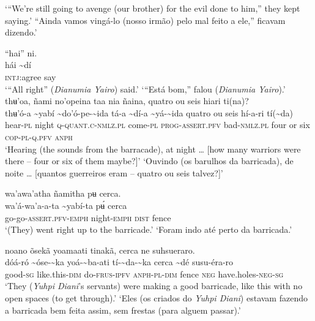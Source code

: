 \documentclass[output=paper,
modfonts,nonflat
]{langsci/langscibook}
\begin{document}
\glt ‘“We're still going to avenge (our brother) for the evil done to him,” they kept saying.’
\glt “Ainda vamos vingá-lo (nosso irmão) pelo mal feito a ele,” ficavam dizendo.’
\z

\ea “hai” ni. \\[.3em]
\gll hái	{\textasciitilde}dí \\
     \textsc{intj:}agree	say\\
\glt ‘“All right” (\textit{Dianumia Yairo}) said.’
\glt ‘“Está bom,” falou (\textit{Dianumia Yairo}).’
\z 
\ea thʉ'oa, ñami no'opeina taa nia ñaina, quatro ou seis hiari ti(na)?  \\[.3em]
\gll thʉ'ó-a	{\textasciitilde}yabí	{\textasciitilde}do'ó-pe-{\textasciitilde}ida	tá-a	{\textasciitilde}dí-a	{\textasciitilde}yá-{\textasciitilde}ida quatro ou seis	hí-a-ri	tí({\textasciitilde}da)\\
     hear\textsc{-pl}	night	\textsc{q-quant.c-nmlz.pl}	come\textsc{-pl}	\textsc{prog-assert.pfv}	bad\textsc{-nmlz.pl} four or six	\textsc{cop-pl-q.pfv}	\textsc{anph}\\
\glt ‘Hearing (the sounds from the barracade), at night … [how many warriors were there – four or six of them maybe?]’ 
\glt ‘Ouvindo (os barulhos da barricada), de noite … [quantos guerreiros eram – quatro ou seis talvez?]’ 
\z 

\ea wa'awa'atha ñamitha pʉ cerca. \\[.3em]
\gll wa'á-wa'a-a-ta	{\textasciitilde}yabí-ta	pʉ́	cerca \\
     go-go-\textsc{assert.pfv-emph}	night-\textsc{emph}	\textsc{dist} fence\\
\glt ‘(They) went right up to the barricade.’
\glt ‘Foram indo até perto da barricada.’
\z 

\ea noano õsekã yoamaati tinakã, cerca ne suhsueraro. \\[.3em]
\gll {\textasciitilde}dóá-ró	{\textasciitilde}óse-{\textasciitilde}ka	yoá-{\textasciitilde}ba-ati	tí-{\textasciitilde}da-{\textasciitilde}ka	cerca	{\textasciitilde}dé	susu-éra-ro \\
     good\textsc{-sg}	like.this-\textsc{dim}	do-\textsc{frus-ipfv}	\textsc{anph-pl-dim}	fence	\textsc{neg}	have.holes\textsc{-neg-sg}\\
\glt ‘They (\textit{Yuhpi Diani}'s servants) were making a good barricade, like this with no open spaces (to get through).’
\glt ‘Eles (os criados do \textit{Yuhpi Diani}) estavam fazendo a barricada bem feita assim, sem frestas (para alguem passar).’
\z 
\end{document}
